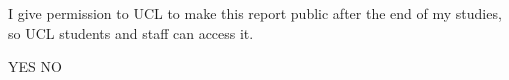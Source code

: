 \begin{center}
    \vspace{10mm}
    \begin{minipage}[t]{0.7\textwidth}
        \centering
        \large I give permission to UCL to make this report public after the end of my studies, so UCL students and staff can access it.
    \end{minipage}
    \vspace{2mm}

    \makebox[0pt][l]{$\square$}\raisebox{0.15ex}{\hspace{0.1em}$\checkmark$} YES \hspace{15mm} \makebox{$\square$} NO


\end{center}
